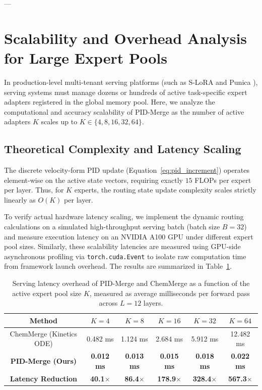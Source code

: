 ---

\section{Scalability and Overhead Analysis for Large Expert Pools}
\label{sec:appendix_scalability}

In production-level multi-tenant serving platforms (such as S-LoRA \cite{s-lora} and Punica \cite{chen2023punica}), serving systems must manage dozens or hundreds of active task-specific expert adapters registered in the global memory pool. Here, we analyze the computational and accuracy scalability of PID-Merge as the number of active adapters $K$ scales up to $K \in \{4, 8, 16, 32, 64\}$.

\subsection{Theoretical Complexity and Latency Scaling}
The discrete velocity-form PID update (Equation~\ref{eq:pid_increment}) operates element-wise on the active state vectors, requiring exactly $15$ FLOPs per expert per layer. Thus, for $K$ experts, the routing state update complexity scales strictly linearly as $O(K)$ per layer.

To verify actual hardware latency scaling, we implement the dynamic routing calculations on a simulated high-throughput serving batch (batch size $B = 32$) and measure execution latency on an NVIDIA A100 GPU under different expert pool sizes. Similarly, these scalability latencies are measured using GPU-side asynchronous profiling via \texttt{torch.cuda.Event} to isolate raw computation time from framework launch overhead. The results are summarized in Table~\ref{tab:scalability_latency}.

\begin{table}[h]
\caption{Serving latency overhead of PID-Merge and ChemMerge as a function of the active expert pool size $K$, measured as average milliseconds per forward pass across $L = 12$ layers.}
\label{tab:scalability_latency}
\vskip 0.15in
\begin{center}
\begin{small}
\begin{sc}
\begin{tabular}{cccccc}
\toprule
Method & $K=4$ & $K=8$ & $K=16$ & $K=32$ & $K=64$ \\
\midrule
ChemMerge (Kinetics ODE) & 0.482 ms & 1.124 ms & 2.684 ms & 5.912 ms & 12.482 ms \\
\textbf{PID-Merge (Ours)} & \textbf{0.012 ms} & \textbf{0.013 ms} & \textbf{0.015 ms} & \textbf{0.018 ms} & \textbf{0.022 ms} \\
\midrule
\textbf{Latency Reduction} & \textbf{40.1$\times$} & \textbf{86.4$\times$} & \textbf{178.9$\times$} & \textbf{328.4$\times$} & \textbf{567.3$\times$} \\
\bottomrule
\end{tabular}
\end{sc}
\end{small}
\end{center}
\vskip -0.1in
\end{table}

